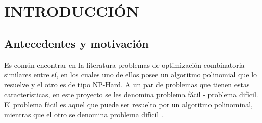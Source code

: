 
\chapter{INTRODUCCIÓN}
\label{cap:intro}




\section{Antecedentes y motivación}
\label{intro:motivacion}

Es común encontrar en la literatura problemas de optimización combinatoria similares entre sí, en los cuales uno de ellos posee un algoritmo polinomial que lo resuelve \citep{papadimitriou1982combinatorial} y el otro es de tipo NP-Hard.
A un par de problemas que tienen estas características, en este proyecto se les denomina problema fácil - problema difícil. El problema fácil es aquel que puede ser resuelto por un algoritmo polinominal, mientras que el otro se denomina problema difícil \citep{cook1995combinatorial}.

